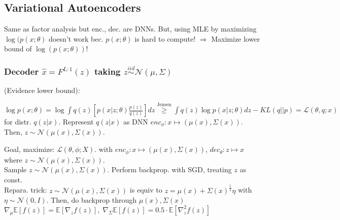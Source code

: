 \subsection*{Variational Autoencoders}Same as factor analysis but enc., dec. are DNNs. But, using MLE by maximizing $\log(p(x;\theta)$ doesn't work bec. $p(x;\theta)$ is hard to compute! $\Rightarrow$ Maximize lower bound of $\log(p(x;\theta))$!
\subsubsection*{Decoder $\hat{x}=F^{L:1}(z)$ taking  $z\stackrel{iid}{\sim}\mathcal{N}(\mu,\Sigma)$} 
(Evidence lower bound):

$\log p(x;\theta)=\log\int q(z)[p(x|z;\theta)\frac{p(z)}{q(z)}]dz
\stackrel{\text{Jensen}}{\ge} \int q(z)\log p(x|z;\theta)dz-KL(q||p)=\mathcal{L}(\theta,q;x)$
for  distr. $q(z|x)$. Represent $q(z|x)$ as DNN $enc_\phi: x \mapsto (\mu(x), \Sigma(x))$. Then, $z \sim \mathcal{N}(\mu(x), \Sigma(x))$.

 Goal, maximize:
$\mathcal{L}(\theta, \phi;X)$. with $enc_\phi: x \mapsto (\mu(x), \Sigma(x))$, $dec_\theta: z \mapsto x$ where $z \sim \mathcal{N}(\mu(x), \Sigma(x))$.\\
 Sample $z \sim \mathcal{N}(\mu(x), \Sigma(x))$. Perform backprop. with SGD, treating $z$ as const.\\
Repara. trick: $z \sim \mathcal{N}(\mu(x), \Sigma(x))$ is equiv to $z = \mu(x) + \Sigma(x)^{\frac{1}{2}}\eta$ with $\eta \sim \mathcal{N}(0, I)$. Then, do backprop through $\mu(x), \Sigma(x)$
 $\nabla_{\mu}\mathbb{E}[f(z)]=\mathbb{E}[\nabla_z f(z)],\; \nabla_{\Sigma}\mathbb{E}[f(z)]=0.5\cdot\mathbb{E}[\nabla_z^2 f(z)]$


